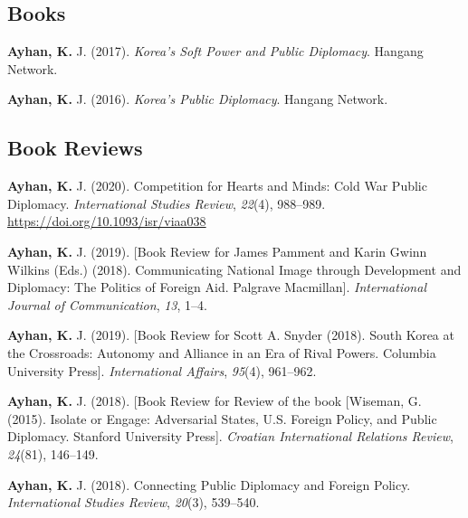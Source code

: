 \documentclass[11pt,a4paper,]{awesome-cv}
\begin{document}
\hypertarget{books}{%
\subsection{Books}\label{books}}

\hypertarget{refs_books}{}
\leavevmode{}%
\textbf{Ayhan, K.} J. (2017). \emph{Korea's {Soft} {Power} and {Public}
{Diplomacy}}. Hangang Network.

\leavevmode{}%
\textbf{Ayhan, K.} J. (2016). \emph{Korea's {Public} {Diplomacy}}.
Hangang Network.

\hypertarget{book-reviews}{%
\subsection{Book Reviews}\label{book-reviews}}

\hypertarget{refs_reviews}{}
\leavevmode{}%
\textbf{Ayhan, K.} J. (2020). Competition for {Hearts} and {Minds}:
{Cold} {War} {Public} {Diplomacy}. \emph{International Studies Review},
\emph{22}(4), 988--989. \url{https://doi.org/10.1093/isr/viaa038}

\leavevmode{}%
\textbf{Ayhan, K.} J. (2019). {[}{Book} {Review} for {James} {Pamment}
and {Karin} {Gwinn} {Wilkins} ({Eds}.) (2018). {Communicating}
{National} {Image} through {Development} and {Diplomacy}: {The}
{Politics} of {Foreign} {Aid}. {Palgrave} {Macmillan}{]}.
\emph{International Journal of Communication}, \emph{13}, 1--4.

\leavevmode{}%
\textbf{Ayhan, K.} J. (2019). {[}{Book} {Review} for {Scott} {A}.
{Snyder} (2018). {South} {Korea} at the {Crossroads}: {Autonomy} and
{Alliance} in an {Era} of {Rival} {Powers}. {Columbia} {University}
{Press}{]}. \emph{International Affairs}, \emph{95}(4), 961--962.

\leavevmode{}%
\textbf{Ayhan, K.} J. (2018). {[}{Book} {Review} for {Review} of the
book {[}{Wiseman}, {G}. (2015). {Isolate} or {Engage}: {Adversarial}
{States}, {U}.{S}. {Foreign} {Policy}, and {Public} {Diplomacy}.
{Stanford} {University} {Press}{]}. \emph{Croatian International
Relations Review}, \emph{24}(81), 146--149.

\leavevmode{}%
\textbf{Ayhan, K.} J. (2018). Connecting {Public} {Diplomacy} and
{Foreign} {Policy}. \emph{International Studies Review}, \emph{20}(3),
539--540.
\end{document}
